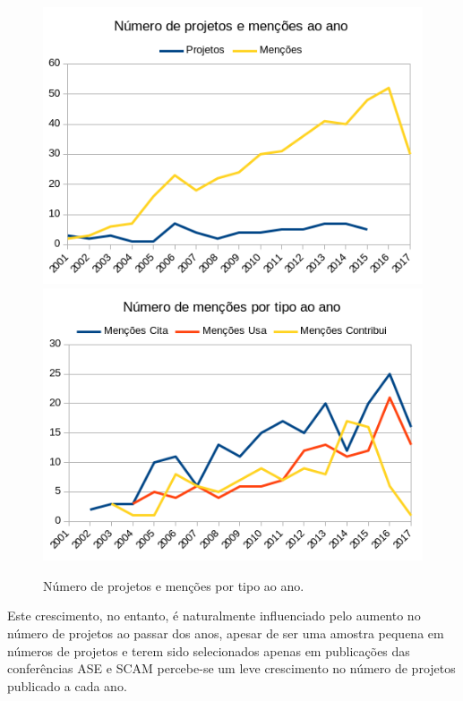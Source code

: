 \begin{figure}[h]
  \centering
  \includegraphics[scale=0.6]{imagens/mentions-projects-by-year.png}
  \includegraphics[scale=0.6]{imagens/mentions-type-by-year.png}
  \caption{Número de projetos e menções por tipo ao ano.}
  \label{mentions-by-year}
\end{figure}

Este crescimento, no entanto, é naturalmente influenciado pelo aumento no
número de projetos ao passar dos anos, apesar de ser uma amostra pequena em
números de projetos e terem sido selecionados apenas em publicações das
conferências ASE e SCAM percebe-se um leve crescimento no número de projetos
publicado a cada ano.


